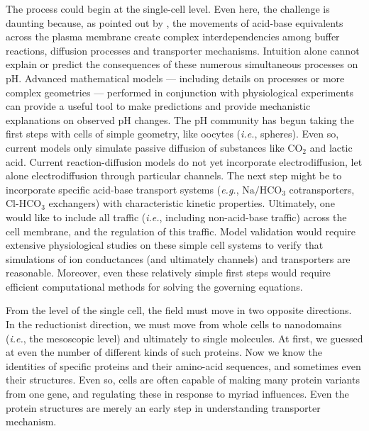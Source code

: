 \documentclass[fleqn,10pt]{physiome}
\begin{document}
The process could begin at the single-cell level. Even here, the challenge is daunting because, as pointed out by \cite{occhipinti2015mathematical}, the movements of acid-base equivalents across the plasma membrane create complex interdependencies among buffer reactions, diffusion processes and transporter mechanisms. Intuition alone cannot explain or predict the consequences of these numerous simultaneous processes on $\mathrm{pH}$. Advanced mathematical models --- including details on processes or more complex geometries --- performed in conjunction with physiological experiments can provide a useful tool to make predictions and provide mechanistic explanations on observed $\mathrm{pH}$ changes. The $\mathrm{pH}$ community has begun taking the first steps with cells of simple geometry, like oocytes (\emph{i.e.}, spheres). Even so, current models only simulate passive diffusion of substances like $\mathrm{CO_2}$ and lactic acid. Current reaction-diffusion models do not yet incorporate electrodiffusion, let alone electrodiffusion through particular channels. The next step might be to incorporate specific acid-base transport systems (\emph{e.g.}, $\mathrm{Na}/\mathrm{HCO_3}$ cotransporters, $\mathrm{Cl}$-$\mathrm{HCO_3}$ exchangers) with characteristic kinetic properties. Ultimately, one would like to include all traffic (\emph{i.e.}, including non-acid-base traffic) across the cell membrane, and the regulation of this traffic. Model validation would require extensive physiological studies on these simple cell systems to verify that simulations of ion conductances (and ultimately channels) and transporters are reasonable. Moreover, even these relatively simple first steps would require efficient computational methods for solving the governing equations.

From the level of the single cell, the field must move in two opposite directions. In the reductionist direction, we must move from whole cells to nanodomains (\emph{i.e.}, the mesoscopic level) and ultimately to single molecules. At first, we guessed at even the number of different kinds of such proteins. Now we know the identities of specific proteins and their amino-acid sequences, and sometimes even their structures. Even so, cells are often capable of making many protein variants from one gene, and regulating these in response to myriad influences. Even the protein structures are merely an early step in understanding transporter mechanism.
\end{document}
